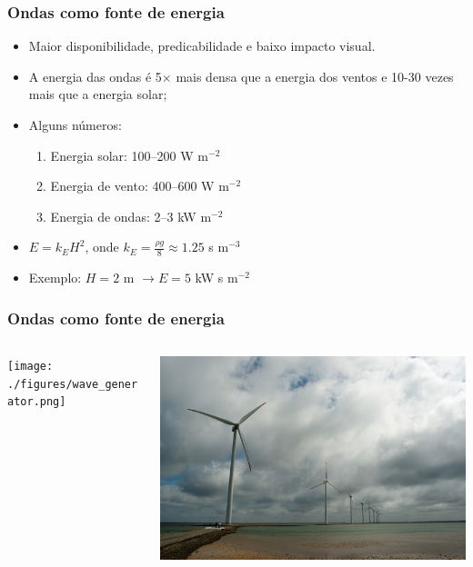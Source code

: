 \begin{frame}
    \frametitle{Ondas como fonte de energia}
        \footnotesize{
            \begin{itemize}[<+-| alert@+>]
                \item Maior disponibilidade, predicabilidade e baixo impacto
                      visual.
                \item A energia das ondas é 5$\times$ mais densa que a energia dos
                      ventos e 10-30 vezes mais que a energia solar;
                \item Alguns números:
                    \begin{enumerate}[<+-| alert@+>]
                        \item[] Energia solar: 100--200 W m$^{-2}$
                        \item[] Energia de vento: 400--600 W m$^{-2}$
                        \item[] Energia de ondas: 2--3 kW m$^{-2}$
                    \end{enumerate}
                \item $E = k_EH^2$, onde $k_E = \frac{\rho g}{8} \approx
                      1.25$ s m$^{-3}$
                \item Exemplo: $H = 2$ m $\rightarrow E = 5$ kW s m$^{-2}$
            \end{itemize}
            }
\end{frame}

\begin{frame}
    \frametitle{Ondas como fonte de energia}
    \begin{columns}
        \begin{column}{0.5\textwidth}
            \begin{center}
                \texttt{[image: ./figures/wave\_generator.png]}
            \end{center}
        \end{column}
        \begin{column}{0.5\textwidth}
            \begin{center}
                \includegraphics[width=\columnwidth]{./figures/ronland_windpark.jpg}
            \end{center}
        \end{column}
    \end{columns}
\end{frame}

